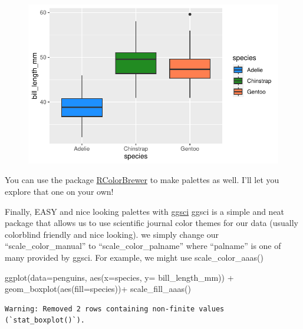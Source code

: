 \documentclass[
  letterpaper,
  DIV=11,
  numbers=noendperiod]{scrartcl}
\newenvironment{Shaded}{\begin{snugshade}}{\end{snugshade}}
\newcommand{\AttributeTok}[1]{\textcolor[rgb]{0.40,0.45,0.13}{#1}}
\newcommand{\FunctionTok}[1]{\textcolor[rgb]{0.28,0.35,0.67}{#1}}
\newcommand{\NormalTok}[1]{\textcolor[rgb]{0.00,0.23,0.31}{#1}}
\newcommand{\SpecialCharTok}[1]{\textcolor[rgb]{0.37,0.37,0.37}{#1}}
\begin{document}
\begin{figure}[H]

{\centering \includegraphics{colors_files/figure-pdf/unnamed-chunk-5-1.pdf}

}

\end{figure}

You can use the package
\href{https://renenyffenegger.ch/notes/development/languages/R/packages/RColorBrewer/index}{RColorBrewer}
to make palettes as well. I'll let you explore that one on your own!

Finally, EASY and nice looking palettes with
\href{https://cran.r-project.org/web/packages/ggsci/vignettes/ggsci.html}{ggsci}
ggsci is a simple and neat package that allows us to use scientific
journal color themes for our data (usually colorblind friendly and nice
looking). we simply change our ``scale\_color\_manual'' to
``scale\_color\_palname'' where ``palname'' is one of many provided by
ggsci. For example, we might use scale\_color\_aaas()

\begin{Shaded}
\begin{Highlighting}[]
\FunctionTok{ggplot}\NormalTok{(}\AttributeTok{data=}\NormalTok{penguins, }\FunctionTok{aes}\NormalTok{(}\AttributeTok{x=}\NormalTok{species, }\AttributeTok{y=}\NormalTok{ bill\_length\_mm)) }\SpecialCharTok{+}
  \FunctionTok{geom\_boxplot}\NormalTok{(}\FunctionTok{aes}\NormalTok{(}\AttributeTok{fill=}\NormalTok{species))}\SpecialCharTok{+}
  \FunctionTok{scale\_fill\_aaas}\NormalTok{()}
\end{Highlighting}
\end{Shaded}

\begin{verbatim}
Warning: Removed 2 rows containing non-finite values (`stat_boxplot()`).
\end{verbatim}
\end{document}
